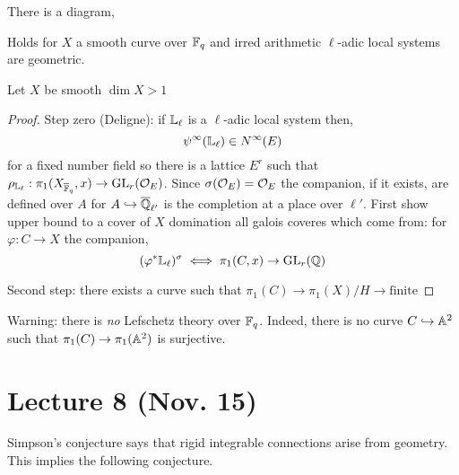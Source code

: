 \documentclass[12pt]{article}
\begin{document}
\begin{conj}
There is a diagram,
\begin{center}
\end{center}
\end{conj}

\begin{theorem}[Lafforge]
Holds for $X$ a smooth curve over $\mathbb{F}_q$ and irred arithmetic $\ell$-adic local systems are geometric.
\end{theorem}

\begin{theorem}[Drinfeld]
Let $X$ be smooth $\dim{X} > 1$
\end{theorem}

\begin{proof}
Step zero (Deligne): if $\mathbb{L}_{\ell}$ is a $\ell$-adic local system then,
\[ \psi^{\infty}(\mathbb{L}_{\ell}) \in N^{\infty}(E) \]
for a fixed number field so there is a lattice $E^r$ such that $\rho_{\mathbb{L}_\ell} : \pi_1(X_{\overline{\mathbb{F}}_q}, x) \to \mathrm{GL}_r(\mathcal{O}_{E})$. Since $\sigma(\mathcal{O}_{E}) = \mathcal{O}_{E}$ the companion, if it exists, are defined over $A$ for $A \hookrightarrow \overline{\mathbb{Q}}_{\ell'}$ is the completion at a place over $\ell'$. 
First show upper bound to a cover of $X$ domination all galois coveres which come from: for $\varphi : C \to X$ the companion,
\[ (\varphi^* \mathbb{L}_{\ell})^{\sigma} \iff \pi_1(C, x) \to \mathrm{GL}_r(\mathbb{Q}) \]


Second step: there exists a curve such that $\pi_1(C) \to \pi_1(X) / H \to \text{finite}$

\end{proof}


\begin{rmk}
Warning: there is \textit{no} Lefschetz theory over $\mathbb{F}_q$. Indeed, there is no curve $C \hookrightarrow \mathbb{A}^2$ such that $\pi_1(C) \to \pi_1(\mathbb{A}^2)$ is surjective.
\end{rmk}

\section{Lecture 8 (Nov. 15)}

\begin{rmk}
Simpson's conjecture says that rigid integrable connections arise from geometry. This implies the following conjecture.
\end{rmk}
\end{document}

